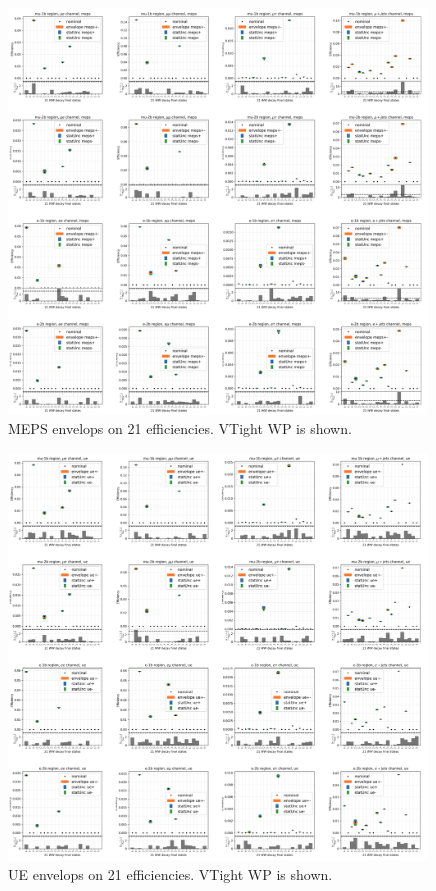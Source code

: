 \begin{figure}
    \centering
    \includegraphics[width=0.99\textwidth]{chapters/Analysis/sectionSystematics/figures/ttTheoretical/meps.png}
    \caption{MEPS envelops on 21 efficiencies. VTight WP is shown.}
    \label{fig:analysis:systematics:effAfterCorrMEPS}
\end{figure}


\begin{figure}
    \centering
    \includegraphics[width=0.99\textwidth]{chapters/Analysis/sectionSystematics/figures/ttTheoretical/ue.png}
    \caption{UE envelops on 21 efficiencies. VTight WP is shown.}
    \label{fig:analysis:systematics:effAfterCorrUE}
\end{figure}




